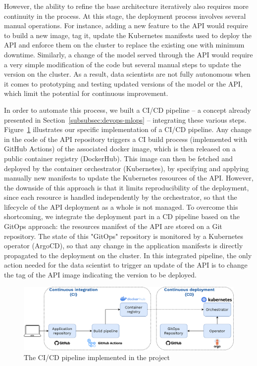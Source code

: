 \documentclass[graybox]{svmult}
\begin{document}
However, the ability to refine the base architecture iteratively also requires more continuity in the process. At this stage, the deployment process involves several manual operations. For instance, adding a new feature to the API would require to build a new image, tag it, update the Kubernetes manifests used to deploy the API and enforce them on the cluster to replace the existing one with minimum downtime. Similarly, a change of the model served through the API would require a very simple modification of the code but several manual steps to update the version on the cluster. As a result, data scientists are not fully autonomous when it comes to prototyping and testing updated versions of the model or the API, which limit the potential for continuous improvement.

In order to automate this process, we built a CI/CD pipeline -- a concept already presented in Section~\ref{subsubsec:devops-mlops} -- integrating these various steps. Figure~\ref{fig:ci-cd} illustrates our specific implementation of a CI/CD pipeline. Any change in the code of the API repository triggers a CI build process (implemented with GitHub Actions) of the associated docker image, which is then released on a public container registry (DockerHub). This image can then be fetched and deployed by the container orchestrator (Kubernetes), by specifying and applying manually new manifests to update the Kubernetes resources of the API. However, the downside of this approach is that it limits reproducibility of the deployment, since each resource is handled independently by the orchestrator, so that the lifecycle of the API deployment as a whole is not managed. To overcome this shortcoming, we integrate the deployment part in a CD pipeline based on the GitOps approach: the resources manifest of the API are stored on a Git repository. The state of this "GitOps" repository is monitored by a Kubernetes operator (ArgoCD), so that any change in the application manifests is directly propagated to the deployment on the cluster. In this integrated pipeline, the only action needed for the data scientist to trigger an update of the API is to change the tag of the API image indicating the version to be deployed.

\begin{figure}[htbp]
    \centering
    \includegraphics[width=\textwidth]{figures/ci-cd.png}
    \caption{The CI/CD pipeline implemented in the project}
    \label{fig:ci-cd}
\end{figure}
\end{document}
